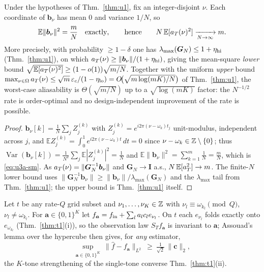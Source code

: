 \begin{theorem}\label{thm:u3a}
Under the hypotheses of Thm.~\ref{thm:u1}, fix an integer-disjoint $\nu$.  Each coordinate of
$\bm b_\nu$ has mean $0$ and variance $1/N$, so
\begin{equation}\label{eq:u3a-sm}
\mathbb E\lVert\bm b_\nu\rVert^2=\frac mN\quad\text{exactly},\qquad\text{hence}\qquad
N\,\mathbb E[a_T(\nu)^2]\xrightarrow[N\to\infty]{}m .
\end{equation}
More precisely, with probability $\ge1-\delta$ one has $\lambda_{\max}(\bm G_N)\le1+\eta_{\rm
hi}$ (Thm.~\ref{thm:u1}), on which $a_T(\nu)\ge\lVert\bm b_\nu\rVert/(1+\eta_{\rm hi})$, giving
the mean-square \emph{lower} bound $\sqrt{\mathbb E[a_T(\nu)^2]}\ge(1-o(1))\sqrt{m/N}$.  Together
with the uniform \emph{upper} bound $\max_{\nu\in\Omega}a_T(\nu)\le\sqrt m\,\varepsilon_c/(1-\eta_{\rm
lo})=O\!\big(\sqrt{m\log(mK)/N}\big)$ of Thm.~\ref{thm:u1}, the worst-case aliasability is
$\Theta(\sqrt{m/N})$ up to a $\sqrt{\log(mK)}$ factor: the $N^{-1/2}$ rate is order-optimal and
no design-independent improvement of the rate is possible.
\end{theorem}

\begin{proof}
$\bm b_\nu[k]=\frac1N\sum_j Z_j^{(k)}$ with $Z_j^{(k)}=e^{i2\pi(\nu-\omega_k)t_j}$ unit-modulus,
independent across $j$, and $\mathbb E Z_j^{(k)}=\int_0^1 e^{i2\pi(\nu-\omega_k)t}\,dt=0$ since
$\nu-\omega_k\in\mathbb{Z}\setminus\{0\}$; thus $\operatorname{Var}(\bm b_\nu[k])=\frac1{N^2}\sum_j\mathbb
E|Z_j^{(k)}|^2=\frac1N$ and $\mathbb E\lVert\bm b_\nu\rVert^2=\sum_{k=1}^m\frac1N=\frac mN$,
which is \eqref{eq:u3a-sm}.  As $a_T(\nu)=\lVert\bm G_N^{-1}\bm b_\nu\rVert$ and $\bm G_N\to\bm
I$ a.s., $N\,\mathbb E[a_T^2]\to m$.  The finite-$N$ lower bound uses
$\lVert\bm G_N^{-1}\bm b_\nu\rVert\ge\lVert\bm b_\nu\rVert/\lambda_{\max}(\bm G_N)$ and the
$\lambda_{\max}$ tail from Thm.~\ref{thm:u1}; the upper bound is Thm.~\ref{thm:u1} itself.
\end{proof}

\begin{proposition}\label{prop:u3a-assouad}
Let $t$ be any rate-$Q$ grid subset and $\nu_1,\dots,\nu_K\in\mathbb{Z}$ with $\nu_l\equiv\omega_{k_l}
\pmod Q$, $\nu_l\ne\omega_{k_l}$.  For $\bm a\in\{0,1\}^K$ let $f_{\bm a}=f_{\rm in}+\sum_l a_l
c_l e_{\nu_l}$.  On $t$ each $e_{\nu_l}$ folds exactly onto $e_{\omega_{k_l}}$
(Thm.~\ref{thm:t1}(i)), so the observation law $S_T f_{\bm a}$ is invariant to $\bm a$; Assouad's
lemma over the hypercube then gives, for \emph{any} estimator,
\[
\sup_{\bm a\in\{0,1\}^K}\ \lVert\hat f-f_{\bm a}\rVert_{L^2}\ \ge\ \tfrac1{\sqrt2}\,\lVert\bm
c\rVert_2 ,
\]
the $K$-tone strengthening of the single-tone converse Thm.~\ref{thm:t1}(ii).
\end{proposition}

